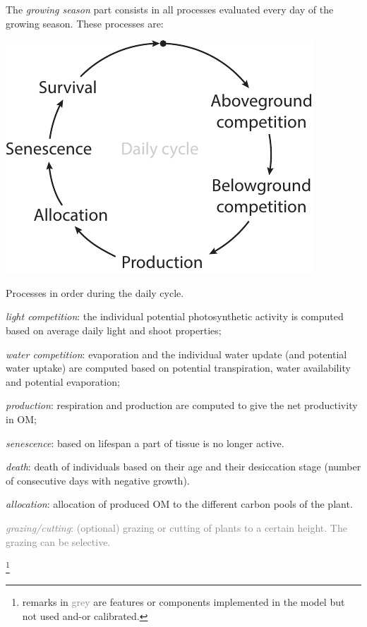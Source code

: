 \documentclass[a4paper,twoside, justified,marginals=raggedright, nobib]{tufte-handout}
\begin{document}
The \textit{growing season} part consists in all processes evaluated every day of the growing season. These processes are:
\begin{marginfigure}
\includegraphics{./Figures/daily_cycle_t.pdf}
\caption{Processes in order during the daily cycle.}
\end{marginfigure}
\begin{itemize}
\setlength\itemsep{0em}
\item \textit{light competition}: the individual potential photosynthetic activity is computed based on average daily light and shoot properties;
\item \textit{water competition}: evaporation and the individual water update (and potential water uptake) are computed based on potential transpiration, water availability and potential evaporation;
\item \textit{production}: respiration and production are computed to give the net productivity in OM;
\item \textit{senescence}: based on lifespan a part of tissue is no longer active.
\item \textit{death}: death of individuals based on their age and their desiccation stage (number of consecutive days with negative growth).
\item \textit{allocation}: allocation of produced OM to the different carbon pools of the plant.
\textcolor{Gray}{\item \textit{grazing/cutting}: (optional) grazing or cutting of plants to a certain height. The grazing can be selective.}\footnote{remarks in \textcolor{Gray}{grey} are features or components implemented in the model but not used and-or calibrated.}
\end{itemize}
\end{document}
